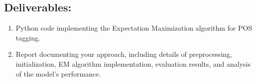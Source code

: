 \documentclass{article}
\begin{document}
\subsection*{Deliverables:}
\begin{enumerate}
    \item Python code implementing the Expectation Maximization algorithm for POS tagging.
    \item Report documenting your approach, including details of preprocessing, initialization, EM algorithm implementation, evaluation results, and analysis of the model's performance.
\end{enumerate}
\end{document}
